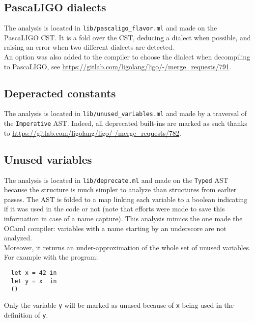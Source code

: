 \documentclass[10pt,a4paper]{article}
\begin{document}
\subsection{PascaLIGO dialects}
The analysis is located in \verb|lib/pascaligo_flavor.ml| and made on the PascaLIGO CST. It is a fold over the CST, deducing a dialect when possible, and raising an error when two different dialects are detected.\\
An option was also added to the compiler to choose the dialect when decompiling to PascaLIGO, see \url{https://gitlab.com/ligolang/ligo/-/merge_requests/791}.

\subsection{Deperacted constants}

The analysis is located in \verb|lib/unused_variables.ml| and made by a traversal of the \verb|Imperative| AST. Indeed, all deprecated built-ins are marked as such thanks to \url{https://gitlab.com/ligolang/ligo/-/merge_requests/782}.

\subsection{Unused variables}

The analysis is located in \verb|lib/deprecate.ml| and made on the \verb|Typed| AST because the structure is much simpler to analyze than structures from earlier passes. The AST is folded to a map linking each variable to a boolean indicating if it was used in the code or not (note that efforts were made to save this information in case of a name capture).
This analysis mimics the one made the OCaml compiler: variables with a name starting by an underscore are not analyzed.\\
Moreover, it returns an under-approximation of the whole set of unused variables.
For example with the program:
\begin{verbatim}
  let x = 42 in
  let y = x  in
  ()
\end{verbatim}
Only the variable \verb|y| will be marked as unused because of \verb|x| being used in the definition of \verb|y|.


{}
\end{document}

